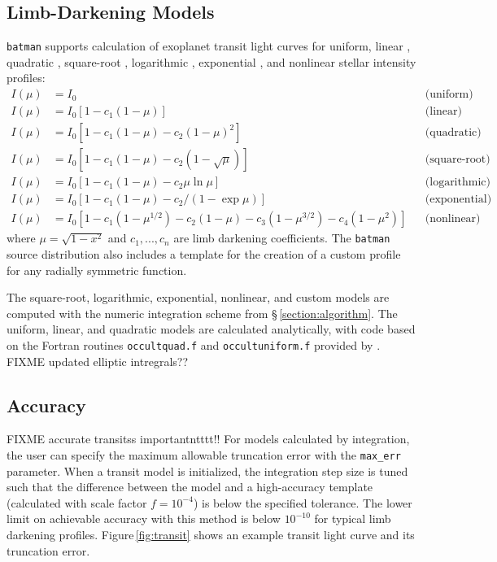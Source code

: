 \documentclass[12pt,preprint]{aastex}
\begin{document}
\subsection{Limb-Darkening Models}
\texttt{batman} supports calculation of exoplanet transit light curves for uniform, linear \citep{schwarzschild06}, quadratic \citep{kopal50}, square-root \citep{diaz-cordoves92}, logarithmic \citep{klinglesmith70}, exponential \citep{claret03}, and nonlinear \citep{claret00} stellar intensity profiles:
\begin{align}
  I(\mu) &= I_0                                                                         & &\text{(uniform)}             \\
  I(\mu) &= I_0[1 - c_1(1-\mu)]                                                         & &\text{(linear)}              \\
  I(\mu) &= I_0[1 - c_1(1 - \mu) - c_2(1-\mu)^2]                                        & &\text{(quadratic)}           \\
  I(\mu) &= I_0[1 - c_1(1 - \mu) - c_2(1-\sqrt{\mu})]                                   & &\text{(square-root)}         \\
  I(\mu) &= I_0[1 - c_1(1 - \mu) - c_2\mu\ln{\mu}]                                      & &\text{(logarithmic)}         \\
  I(\mu) &= I_0\left[1 - c_1(1 - \mu) - c_2/(1-\exp{\mu})\right]                  	& &\text{(exponential)}         \\
  I(\mu) &= I_0[1 - c_1(1-\mu^{1/2}) - c_2(1- \mu) - c_3(1-\mu^{3/2}) - c_4(1-\mu^2)]   & &\text{(nonlinear)}
\end{align}
where $\mu = \sqrt{1-x^2}$ and $c_1, ..., c_n$ are limb darkening coefficients.  The \texttt{batman} source distribution also includes a template for the creation of a custom profile for any radially symmetric function.  

The square-root, logarithmic, exponential, nonlinear, and custom models are computed with the numeric integration scheme from \S\,\ref{section:algorithm}.  The uniform, linear, and quadratic models are calculated analytically, with code based on the Fortran routines \texttt{occultquad.f} and \texttt{occultuniform.f} provided by \cite{mandel02}.  FIXME updated elliptic intregrals??

\subsection{Accuracy}
FIXME accurate transitss importantntttt!!
For models calculated by integration, the user can specify the maximum allowable truncation error with the \texttt{max\_err} parameter.  When a transit model is initialized, the integration step size is tuned such that the difference between the model and a high-accuracy template (calculated with scale factor $f = 10^{-4}$) is below the specified tolerance.  The lower limit on achievable accuracy with this method is below $10^{-10}$ for typical limb darkening profiles. Figure\,\ref{fig:transit} shows an example transit light curve and its truncation error.
\end{document}
